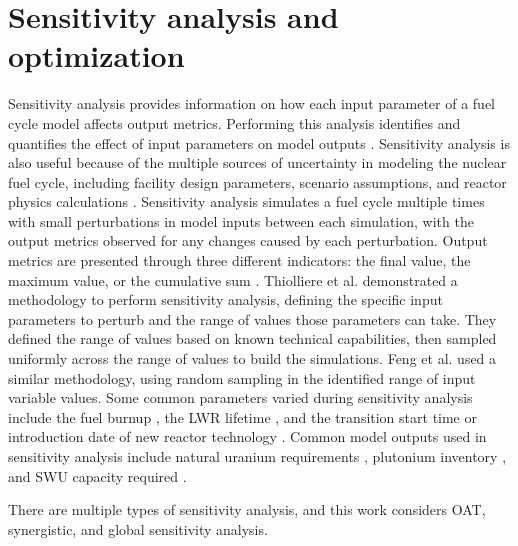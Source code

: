 %
%
%
\section{Sensitivity analysis and optimization}
Sensitivity analysis provides information on how each input parameter 
of a fuel cycle model affects output metrics. 
Performing this analysis identifies and quantifies the effect of input 
parameters on model outputs \cite{thiolliere_methodology_2018}. Sensitivity 
analysis is also useful because of the multiple sources of uncertainty in 
modeling the nuclear fuel cycle, including facility design parameters, 
scenario assumptions, and reactor physics calculations 
\cite{noauthor_effects_2017}.
Sensitivity 
analysis simulates a fuel cycle multiple times 
with small perturbations in model inputs between each simulation, with 
the output metrics observed for any changes caused by each  
perturbation. Output metrics are presented through three different 
indicators: the final value, the maximum value, or the cumulative sum 
\cite{noauthor_effects_2017}. Thiolliere et al. 
\cite{thiolliere_methodology_2018} demonstrated a methodology to 
perform sensitivity analysis, defining the specific input parameters to 
perturb and the range of values those parameters can take.
They defined the range of values based on known technical capabilities, then 
sampled uniformly across the range of values to build the simulations. 
Feng et al. \cite{feng_sensitivity_2020} used a similar methodology, 
using random sampling in the identified range of input variable values.
Some common
parameters varied during sensitivity analysis include the fuel burnup 
\cite{thiolliere_methodology_2018,noauthor_effects_2017}, the \gls{LWR}
lifetime \cite{feng_sensitivity_2020,noauthor_effects_2017}, 
and the transition start time or introduction date of new reactor technology
\cite{chee_sensitivity_2019,passerini_systematic_2014,noauthor_effects_2017}. 
Common model outputs used in sensitivity analysis include 
natural uranium requirements 
\cite{richards_application_2021,noauthor_effects_2017},
plutonium inventory \cite{chee_sensitivity_2019,noauthor_effects_2017}, 
and \gls{SWU} 
capacity required \cite{richards_application_2021,noauthor_effects_2017}.

There are multiple types of sensitivity analysis, and this work considers 
\gls{OAT}, synergistic, and global sensitivity analysis. 

